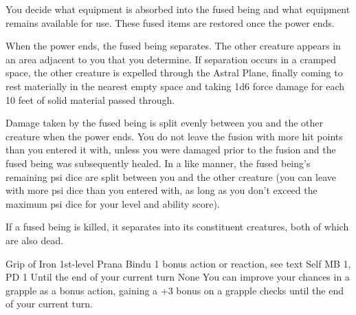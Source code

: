 You decide what equipment is absorbed into the fused being
and what equipment remains available for use. These fused
items are restored once the power ends.

When the power ends, the fused being separates. The other
creature appears in an area adjacent to you that you determine.
If separation occurs in a cramped space, the other creature
is expelled through the Astral Plane, finally coming to rest
materially in the nearest empty space and taking 1d6 force
damage for each 10 feet of solid material passed through.

Damage taken by the fused being is split evenly between you
and the other creature when the power ends. You do not leave
the fusion with more hit points than you entered it with,
unless you were damaged prior to the fusion and the fused
being was subsequently healed. In a like manner, the fused
being's remaining psi dice are split between you and
the other creature (you can leave with more psi dice than you
entered with, as long as you don't exceed the maximum psi dice
for your level and ability score).

If a fused being is killed, it separates into its constituent
creatures, both of which are also dead.

\DndPowerHeader%
    {Grip of Iron\label{pwr:grip_of_iron}}
    {1st-level Prana Bindu}
    {1 bonus action or reaction, see text}
    {Self}
    {MB 1, PD 1}
    {Until the end of your current turn}
    {None}
You can improve your chances in a grapple
as a bonus action, gaining a +3 bonus on a grapple checks
until the end of your current turn.

